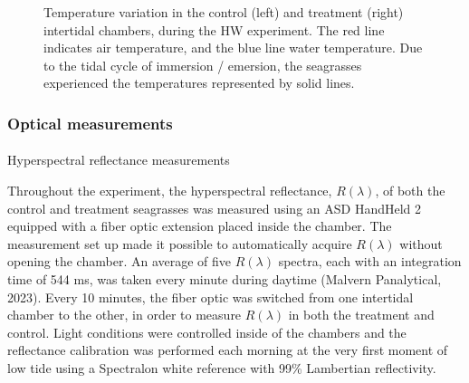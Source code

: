 \documentclass[
  letterpaper,
  11pt,
  english,
  singlespacing,
  headsepline]{MastersDoctoralThesis}
\makeatletter
\let\oldparagraph\paragraph
\renewcommand{\paragraph}{
    \@ifstar
      \xxxParagraphStar
      \xxxParagraphNoStar
  }
\newcommand{\xxxParagraphStar}[1]{\oldparagraph*{#1}\mbox{}}
\newcommand{\xxxParagraphNoStar}[1]{\oldparagraph{#1}\mbox{}}
\makeatother
\begin{document}
\begin{spacing}{1.5}
\begin{figure}


\caption{\label{fig-Profile_h}Temperature variation in the control
(left) and treatment (right) intertidal chambers, during the HW
experiment. The red line indicates air temperature, and the blue line
water temperature. Due to the tidal cycle of immersion / emersion, the
seagrasses experienced the temperatures represented by solid lines.}

\end{figure}%

\subsubsection{Optical measurements}\label{optical-measurements}

\paragraph{Hyperspectral reflectance
measurements}\label{hyperspectral-reflectance-measurements}

Throughout the experiment, the hyperspectral reflectance,
\(R(\lambda)\), of both the control and treatment seagrasses was
measured using an ASD HandHeld 2 equipped with a fiber optic extension
placed inside the chamber. The measurement set up made it possible to
automatically acquire \(R(\lambda)\) without opening the chamber. An
average of five \(R(\lambda)\) spectra, each with an integration time of
544 ms, was taken every minute during daytime (Malvern Panalytical,
2023). Every 10 minutes, the fiber optic was switched from one
intertidal chamber to the other, in order to measure \(R(\lambda)\) in
both the treatment and control. Light conditions were controlled inside
of the chambers and the reflectance calibration was performed each
morning at the very first moment of low tide using a Spectralon white
reference with 99\% Lambertian reflectivity.


\end{spacing}
\end{document}
